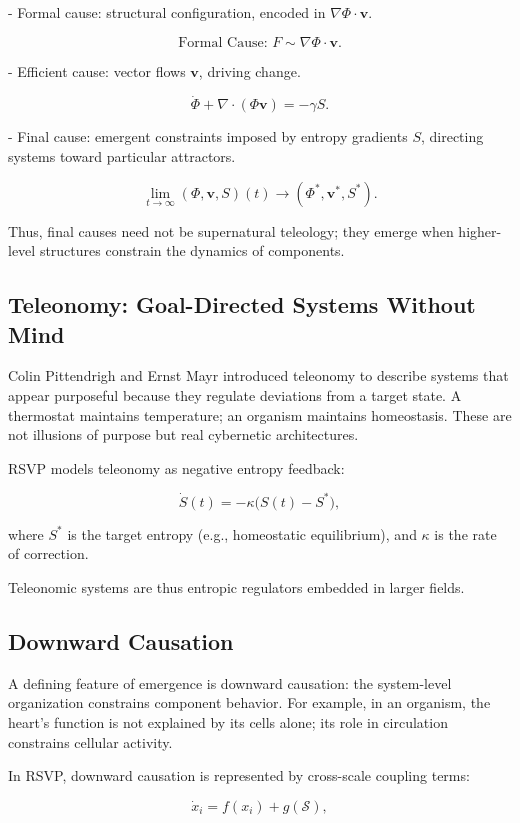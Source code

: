 \documentclass[12pt]{book}
\begin{document}
- Formal cause: structural configuration, encoded in \( \nabla \Phi \cdot \mathbf{v} \).

  \[ \text{Formal Cause: } F \sim \nabla \Phi \cdot \mathbf{v}. \]

- Efficient cause: vector flows \( \mathbf{v} \), driving change.

  \[ \dot{\Phi} + \nabla \cdot (\Phi \mathbf{v}) = -\gamma S. \]

- Final cause: emergent constraints imposed by entropy gradients \( S \), directing systems toward particular attractors.

  \[ \lim_{t\to\infty} (\Phi, \mathbf{v}, S)(t) \to (\Phi^*, \mathbf{v}^*, S^*). \]

Thus, final causes need not be supernatural teleology; they emerge when higher-level structures constrain the dynamics of components.

\subsection{Teleonomy: Goal-Directed Systems Without Mind}
Colin Pittendrigh and Ernst Mayr introduced teleonomy to describe systems that appear purposeful because they regulate deviations from a target state. A thermostat maintains temperature; an organism maintains homeostasis. These are not illusions of purpose but real cybernetic architectures.

RSVP models teleonomy as negative entropy feedback:

\[ \dot{S}(t) = -\kappa \big(S(t) - S^\ast\big), \]

where \( S^\ast \) is the target entropy (e.g., homeostatic equilibrium), and \( \kappa \) is the rate of correction.

Teleonomic systems are thus entropic regulators embedded in larger fields.

\subsection{Downward Causation}
A defining feature of emergence is downward causation: the system-level organization constrains component behavior. For example, in an organism, the heart’s function is not explained by its cells alone; its role in circulation constrains cellular activity.

In RSVP, downward causation is represented by cross-scale coupling terms:

\[ \dot{x}_i = f(x_i) + g(\mathcal{S}), \]
\end{document}
